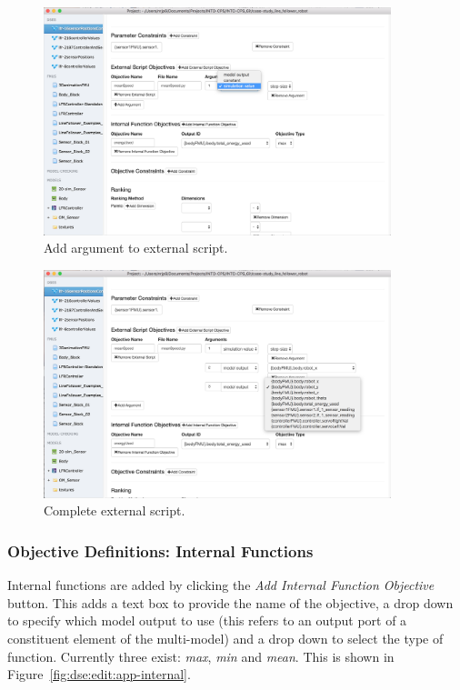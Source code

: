\begin{figure}[ht]
	\centering
	\includegraphics[width=0.9\textwidth]{figures/dse/app-ext-arg}
	\caption{Add argument to external script.}\label{fig:dse:edit:app-ext-arg}
\end{figure}
%
%
%
\begin{figure}[ht]
	\centering
	\includegraphics[width=0.9\textwidth]{figures/dse/app-ext-done}
	\caption{Complete external script.}\label{fig:dse:edit:app-ext-done}
\end{figure}
%
%
%


\subsubsection{Objective Definitions: Internal Functions}\label{sec:dse:app:objectivesinternal}

Internal functions are added by clicking the \textit{Add Internal Function Objective} button. This adds a text box to provide the name of the objective, a drop down to specify which model output to use (this refers to an output port of a constituent element of the multi-model) and a drop down to select the type of function. Currently three exist: \textit{max}, \textit{min} and \textit{mean}. This is shown in Figure~\ref{fig:dse:edit:app-internal}.

